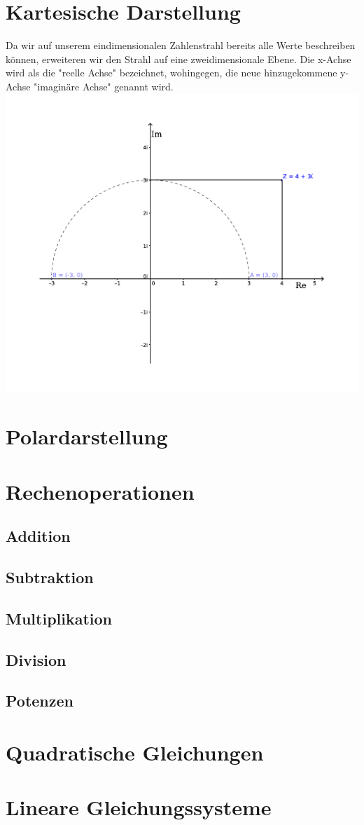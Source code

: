 \documentclass[12pt,a4paper]{scrbook}
\begin{document}
\section{Kartesische Darstellung}
Da wir auf unserem eindimensionalen Zahlenstrahl bereits alle Werte
beschreiben können, erweiteren wir den Strahl auf eine zweidimensionale
Ebene. Die x-Achse wird als die "reelle Achse" bezeichnet, wohingegen,
die neue hinzugekommene y-Achse "imaginäre Achse" genannt wird.\\
\includegraphics[scale=2]{img/komplexe_zahlen.pdf}\\


\section{Polardarstellung}


\section{Rechenoperationen}

\subsection{Addition}

\subsection{Subtraktion}

\subsection{Multiplikation}

\subsection{Division}

\subsection{Potenzen}

\section{Quadratische Gleichungen}

\section{Lineare Gleichungssysteme}
\end{document}
